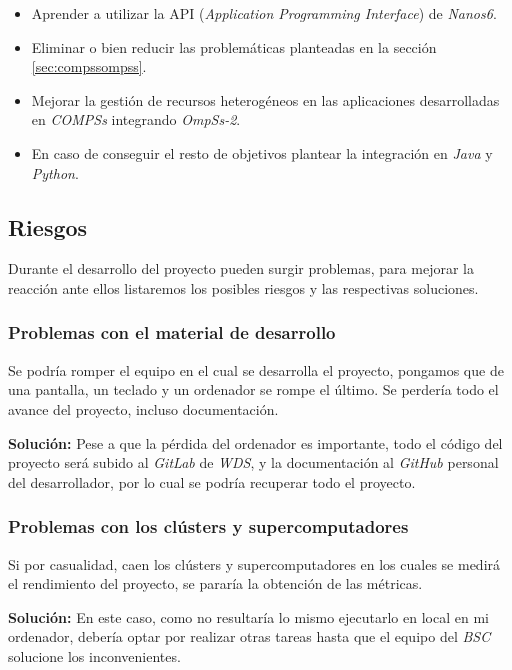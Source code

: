 \begin{itemize}
  \item Aprender a utilizar la API (\textit{Application Programming Interface}) de \textit{Nanos6}.
  \item Eliminar o bien reducir las problemáticas planteadas en la sección   \ref{sec:compssompss}.
  \item Mejorar la gestión de recursos heterogéneos en las aplicaciones desarrolladas en \textit{COMPSs} integrando \textit{OmpSs-2}.
  \item En caso de conseguir el resto de objetivos plantear la integración en \textit{Java} y \textit{Python}.
\end{itemize}

\subsection{Riesgos}

Durante el desarrollo del proyecto pueden surgir problemas, para mejorar la reacción ante ellos listaremos los posibles riesgos y las respectivas soluciones.

\subsubsection{Problemas con el material de desarrollo}

Se podría romper el equipo en el cual se desarrolla el proyecto, pongamos que de una pantalla, un teclado y un ordenador se rompe el último. Se perdería todo el avance del proyecto, incluso documentación.
\par\medskip

\textbf{Solución:} Pese a que la pérdida del ordenador es importante, todo el código del proyecto será subido al \textit{GitLab} de \textit{WDS}, y la documentación al \textit{GitHub} personal del desarrollador, por lo cual se podría recuperar todo el  proyecto.

\subsubsection{Problemas con los clústers y supercomputadores}

Si por casualidad, caen los clústers y supercomputadores en los cuales se medirá el rendimiento del proyecto, se pararía la obtención de las métricas. 
\par\medskip

\textbf{Solución:} En este caso, como no resultaría lo mismo ejecutarlo en local en mi ordenador, debería optar por realizar otras tareas hasta que el equipo del \textit{BSC} solucione los inconvenientes.

